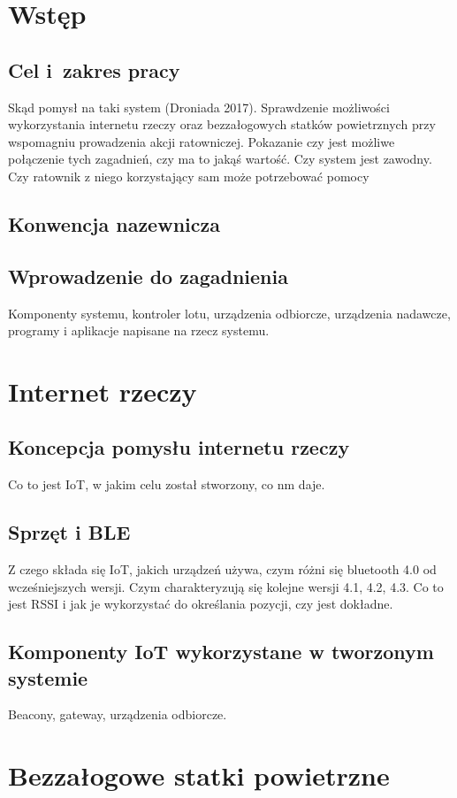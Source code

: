 \section{Wstęp}
\suppressfloats[t]  %
\subsection{Cel i~zakres pracy}
Skąd pomysł na taki system (Droniada 2017). Sprawdzenie możliwości wykorzystania internetu rzeczy oraz bezzałogowych statków powietrznych przy wspomagniu prowadzenia akcji ratowniczej. Pokazanie czy jest możliwe połączenie tych zagadnień, czy ma to jakąś wartość. Czy system jest zawodny. Czy ratownik z niego korzystający sam może potrzebować pomocy
\subsection{Konwencja nazewnicza}
\subsection{Wprowadzenie do zagadnienia}
Komponenty systemu, kontroler lotu, urządzenia odbiorcze, urządzenia nadawcze, programy i aplikacje napisane na rzecz systemu.

\section{Internet rzeczy}
\subsection{Koncepcja pomysłu internetu rzeczy}
Co to jest IoT, w jakim celu został stworzony, co nm daje.
\subsection{Sprzęt i BLE}
Z czego składa się IoT, jakich urządzeń używa, czym różni się bluetooth 4.0 od wcześniejszych wersji. Czym charakteryzują się kolejne wersji 4.1, 4.2, 4.3. Co to jest RSSI i jak je wykorzystać do określania pozycji, czy jest dokładne.
\subsection{Komponenty IoT wykorzystane w tworzonym systemie}
Beacony, gateway, urządzenia odbiorcze.

\section{Bezzałogowe statki powietrzne}
